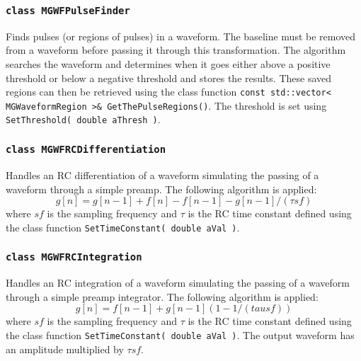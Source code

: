 			\subsubsection{\lstinline!class MGWFPulseFinder!}
Finds pulses (or regions of pulses) in a waveform.  The baseline must be removed from a waveform before passing it through this transformation.  The algorithm searches the waveform and determines when it goes either above a positive threshold or below a negative threshold and stores the results.  These saved regions can then be retrieved using the class function \lstinline!const std::vector< MGWaveformRegion >& GetThePulseRegions()!.  The threshold is set using \lstinline!SetThreshold( double aThresh )!.
		
			\subsubsection{\lstinline!class MGWFRCDifferentiation!}
Handles an RC differentiation of a waveform simulating the passing of a waveform through a simple preamp.  The following algorithm is applied:
				\[
				 g[n] = g[n-1] + f[n] - f[n-1] - g[n-1]/(\tau sf)
				\]
where $sf$ is the sampling frequency and $\tau$ is the RC time constant defined using the class function \lstinline!SetTimeConstant( double aVal )!.

			\subsubsection{\lstinline!class MGWFRCIntegration!}
Handles an RC integration of a waveform simulating the passing of a waveform through a simple preamp integrator.  The following algorithm is applied:
				\[
				g[n] = f[n-1] + g[n-1] (1 - 1/(tau sf) )
				\]
where $sf$ is the sampling frequency and $\tau$ is the RC time constant defined using the class function \lstinline!SetTimeConstant( double aVal )!.  The output waveform has an amplitude multiplied by $\tau sf$.

